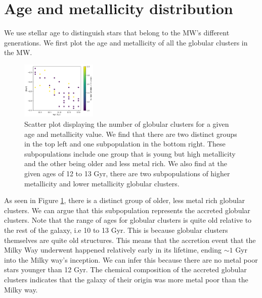 \documentclass[fleqn,usenatbib]{mnras}
\begin{document}
\section{Age and metallicity distribution}
We use stellar age to distinguish stars that belong to the MW's different generations. We first plot the 
age and metallicity of all the globular clusters in the MW.

\begin{figure}
    \centering
    \includegraphics[width=0.32\textwidth]{agefeh.png}
    \caption{Scatter plot displaying the number of globular clusters for a given 
    age and metallicity value. We find that there are two distinct groups in the 
    top left and one subpopulation in the bottom right. These subpopulations 
    include one group that is young but high metallicity and the other being older 
    and less metal rich. We also find at the given ages of 12 to 13 Gyr, there are 
    two subpopulations of higher metallicity and lower metallicity globular 
    clusters.}
    \label{fig:agemetallicity}
\end{figure}

As seen in Figure \ref{fig:agemetallicity}, there is a distinct group of older, less metal rich globular 
clusters. We can argue that this subpopulation represents the accreted globular clusters. Note that the range 
of ages for globular clusters is quite old relative to the rest of the galaxy, i.e 10 to 13 Gyr. This is 
because globular clusters themselves are quite old structures. This means that the accretion event that the 
Milky Way underwent happened relatively early in its lifetime, ending $\sim 1$ Gyr into the Milky way's 
inception. We can infer this because there are no metal poor stars younger than 12 Gyr. The chemical composition 
of the accreted globular clusters indicates that the galaxy of their origin was more metal poor than the Milky 
way.
\end{document}

